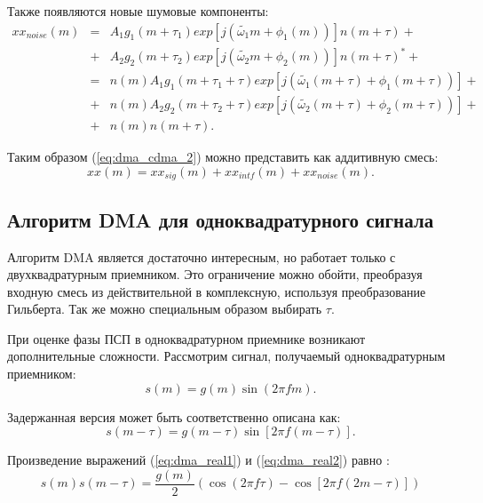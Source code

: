 Также появляются новые шумовые компоненты:
\begin{eqnarray}
	\label{eq:dma_cdma_5}
	xx_{noise}(m) & = & A_{1} g_{1}(m + \tau_1) exp \left[ j \left( \tilde{\omega_1} m + \phi_{1} (m) \right) \right] n(m + \tau) + \nonumber \\
		& + & A_{2} g_{2}(m + \tau_2) exp \left[ j \left( \tilde{\omega_2} m + \phi_{2} (m) \right) \right] n(m + \tau)^* + \nonumber \\
		& = & n(m)A_{1} g_{1}(m + \tau_1 + \tau) exp \left[ j \left( \tilde{\omega_1} (m + \tau) + \phi_{1} (m + \tau) \right) \right] + \nonumber \\
		& + & n(m)A_{2} g_{2}(m + \tau_2 + \tau) exp \left[ j \left( \tilde{\omega_2} (m + \tau) + \phi_{2} (m + \tau) \right) \right] + \nonumber \\
		& + & n(m)n(m+\tau).
\end{eqnarray}

Таким образом (\ref{eq:dma_cdma_2}) можно представить как аддитивную смесь:
\begin{equation}
	\label{eq:dma_cdma_6}
	xx(m) = xx_{sig}(m) + xx_{intf}(m) + xx_{noise}(m).
\end{equation}

\subsection{Алгоритм DMA для одноквадратурного сигнала}
\label{sec1:dma_real}

Алгоритм DMA является достаточно интересным, но работает только с двухквадратурным приемником. Это ограничение можно
обойти, преобразуя входную смесь из действительной в комплексную, используя преобразование Гильберта.
Так же можно специальным образом выбирать ${\tau}$.

При оценке фазы ПСП в одноквадратурном приемнике возникают дополнительные сложности. Рассмотрим сигнал, получаемый одноквадратурным приемником:
\begin{equation}
	\label{eq:dma_real1}
	s(m) = g(m) \sin{(2\pi fm)}.
\end{equation}

Задержанная версия может быть соответственно описана как:
\begin{equation}
	\label{eq:dma_real2}
	s(m - \tau) = g(m - \tau) \sin{\left[2\pi f(m-\tau)\right]}.
\end{equation}

Произведение выражений (\ref{eq:dma_real1}) и (\ref{eq:dma_real2}) равно \cite{tsui}:
\begin{equation}
	\label{eq:dma_real3}
	s(m)s(m - \tau) = \frac{g(m)}{2} \left(\cos (2\pi f \tau) - \cos \left[2 \pi f (2m - \tau)\right]\right)
\end{equation}

